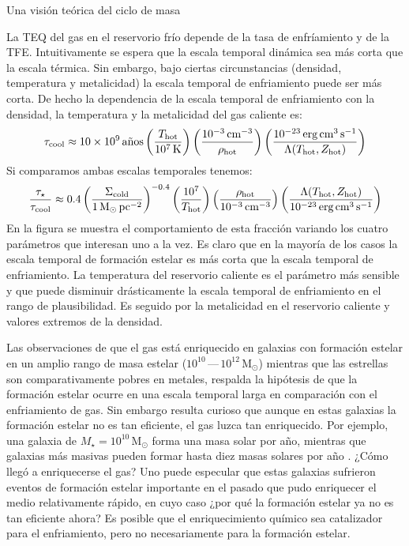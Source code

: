 \documentclass[xcolor=dvipsnames,4pt,hyperref={colorlinks,citecolor=black,linkcolor=black,urlcolor=black}]{beamer}
\begin{document}
\begin{frame}[allowframebreaks]{Una visión teórica del ciclo de masa}
\begin{description}
La TEQ del gas en el reservorio frío depende de la tasa de enfríamiento y de la TFE. Intuitivamente
se espera que la escala temporal dinámica sea más corta que la escala térmica. Sin embargo, bajo
ciertas circunstancias (densidad, temperatura y metalicidad) la escala temporal de enfriamiento
puede ser más corta.
De hecho la dependencia de la escala temporal de enfriamiento con la densidad, la temperatura y la
metalicidad del gas caliente es:
%
\begin{equation}
\tau_\text{cool}\approx10\times10^9\,\text{años}\left(\frac{T_\text{hot}}{10^7\,\text{K}}\right)\left(\frac{10^{-3}\,\text{cm}^{-3}}{\rho_\text{hot}}\right)\left(\frac{10^{-23}\,\text{erg\,cm}^{3}\,\text{s}^{-1}}{\Lambda(T_\text{hot},Z_\text{hot})}\right)
\end{equation}
%
Si comparamos ambas escalas temporales tenemos:
%
\begin{equation*}
\frac{\tau_\star}{\tau_\text{cool}} \approx 0.4\left(\frac{\Sigma_\text{cold}}{1\,\text{M}_\odot\,\text{pc}^{-2}}\right)^{-0.4}\left(\frac{10^7}{T_\text{hot}}\right)\left(\frac{\rho_\text{hot}}{10^{-3}\,\text{cm}^{-3}}\right)\left(\frac{\Lambda(T_\text{hot},Z_\text{hot})}{10^{-23}\,\text{erg\,cm}^{3}\,\text{s}^{-1}}\right)
\end{equation*}
%
En la figura se muestra el comportamiento de esta fracción variando los cuatro parámetros que
interesan uno a la vez. Es claro que en la mayoría de los casos la escala temporal de formación
estelar es más corta que la escala temporal de enfriamiento. La temperatura del reservorio caliente
es el parámetro más sensible y que puede disminuir drásticamente la escala temporal de enfriamiento
en el rango de plausibilidad. Es seguido por la metalicidad en el reservorio caliente y valores
extremos de la densidad.

Las observaciones de que el gas está enriquecido en galaxias con formación estelar en un amplio
rango de masa estelar ($10^{10}\,$---$\,10^{12}\,\text{M}_\odot$)
mientras que las estrellas son comparativamente pobres en metales, respalda la hipótesis de que la
formación estelar ocurre en una escala temporal larga en comparación con el enfriamiento de gas. Sin
embargo resulta curioso que aunque en estas galaxias la formación estelar no es tan eficiente, el
gas luzca tan enriquecido. Por ejemplo, una galaxia de $M_\star=10^{10}\,\text{M}_\odot$ forma una
masa solar por año, mientras que galaxias más masivas pueden formar hasta diez masas solares por año
\citep{Sanchez2013}. ¿Cómo llegó a enriquecerse el gas? Uno puede especular que estas galaxias
sufrieron eventos de formación estelar importante en el pasado que pudo enriquecer el medio
relativamente rápido, en cuyo caso ¿por qué la formación estelar ya no es tan eficiente ahora? Es
posible que el enriquecimiento químico sea catalizador para el enfriamiento, pero no necesariamente
para la formación estelar.


\end{description}
\end{frame}
\end{document}

